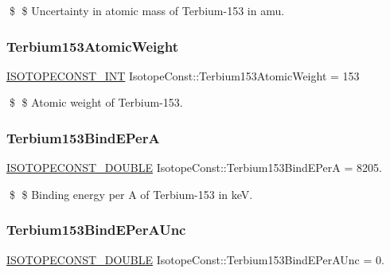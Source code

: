 \$ \$ Uncertainty in atomic mass of Terbium-\/153 in amu. \mbox{\label{group___isotope_const-_terbium-_tb153_ga0ff86ecf536c2101d2804f52d1feb8ee}} 
\subsubsection{\texorpdfstring{Terbium153\+Atomic\+Weight}{Terbium153AtomicWeight}}
{\footnotesize\ttfamily \mbox{\hyperlink{group___isotope_const-_macros_ga5f18360b3e99483a35c32d789e62621c}{I\+S\+O\+T\+O\+P\+E\+C\+O\+N\+S\+T\+\_\+\+I\+NT}} Isotope\+Const\+::\+Terbium153\+Atomic\+Weight = 153}

\$ \$ Atomic weight of Terbium-\/153. \mbox{\label{group___isotope_const-_terbium-_tb153_ga969c801944a6962202c2cc4971321431}} 
\subsubsection{\texorpdfstring{Terbium153\+Bind\+E\+PerA}{Terbium153BindEPerA}}
{\footnotesize\ttfamily \mbox{\hyperlink{group___isotope_const-_macros_ga8f45a7272ce02c0b4c65c44636ed719a}{I\+S\+O\+T\+O\+P\+E\+C\+O\+N\+S\+T\+\_\+\+D\+O\+U\+B\+LE}} Isotope\+Const\+::\+Terbium153\+Bind\+E\+PerA = 8205.}

\$ \$ Binding energy per A of Terbium-\/153 in keV. \mbox{\label{group___isotope_const-_terbium-_tb153_ga32c05fb0b1df26be9cdc9f19d409f18c}} 
\subsubsection{\texorpdfstring{Terbium153\+Bind\+E\+Per\+A\+Unc}{Terbium153BindEPerAUnc}}
{\footnotesize\ttfamily \mbox{\hyperlink{group___isotope_const-_macros_ga8f45a7272ce02c0b4c65c44636ed719a}{I\+S\+O\+T\+O\+P\+E\+C\+O\+N\+S\+T\+\_\+\+D\+O\+U\+B\+LE}} Isotope\+Const\+::\+Terbium153\+Bind\+E\+Per\+A\+Unc = 0.}

